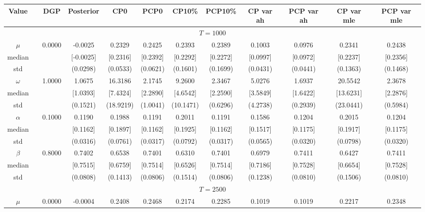 { \renewcommand{\arraystretch}{1.2} 
\begin{sidewaystable} 
\center 
\begin{tabular}{cc cc| cccc| cccc} 
Value && DGP & Posterior & CP0  & PCP0 & CP10\%  & PCP10\% &CP var ah & PCP var ah & CP var mle & PCP var mle \\ \hline 
\hline 
\multicolumn{12}{c}{$T =1000$}  \\ 
\hline 
 \rowcolor{LightCyan} 
$\mu$&& 0.0000 & -0.0025 & 0.2329 & 0.2425 & 0.2393 & 0.2389 & 0.1003 & 0.0976 & 0.2341 & 0.2438  \\   
median &&  & [-0.0025] & [0.2316] & [0.2392] & [0.2292] & [0.2272] & [0.0997] & [0.0972] & [0.2237] & [0.2356]  \\ 
std &&   & (0.0298) & (0.0533) & (0.0621) & (0.1601) & (0.1699) &(0.0431) & (0.0441) & (0.1363) & (0.1468)  \\ 
 \rowcolor{LightCyan} 
$\omega$&& 1.0000 & 1.0675 & 16.3186 & 2.1745 & 9.2600 & 2.3467 & 5.0276 & 1.6937 & 20.5542 & 2.3678  \\   
median &&  & [1.0393] & [7.4324] & [2.2890] & [4.6542] & [2.2590] & [3.5849] & [1.6422] & [13.6231] & [2.2876]  \\ 
std &&   & (0.1521) & (18.9219) & (1.0041) & (10.1471) & (0.6296) &(4.2738) & (0.2939) & (23.0441) & (0.5984)  \\ 
 \rowcolor{LightCyan} 
$\alpha$&& 0.1000 & 0.1190 & 0.1988 & 0.1191 & 0.2011 & 0.1191 & 0.1586 & 0.1204 & 0.2015 & 0.1204  \\   
median &&  & [0.1162] & [0.1897] & [0.1162] & [0.1925] & [0.1162] & [0.1517] & [0.1175] & [0.1917] & [0.1175]  \\ 
std &&   & (0.0316) & (0.0761) & (0.0317) & (0.0792) & (0.0317) &(0.0565) & (0.0320) & (0.0798) & (0.0320)  \\ 
 \rowcolor{LightCyan} 
$\beta$&& 0.8000 & 0.7402 & 0.6538 & 0.7401 & 0.6310 & 0.7401 & 0.6979 & 0.7411 & 0.6427 & 0.7411  \\   
median &&  & [0.7515] & [0.6759] & [0.7514] & [0.6526] & [0.7514] & [0.7186] & [0.7528] & [0.6654] & [0.7528]  \\ 
std &&   & (0.0808) & (0.1413) & (0.0806) & (0.1514) & (0.0806) &(0.1238) & (0.0810) & (0.1506) & (0.0810)  \\ 
\hline 
\multicolumn{12}{c}{$T =2500$}  \\ 
\hline 
 \rowcolor{LightCyan} 
$\mu$&& 0.0000 & -0.0004 & 0.2408 & 0.2468 & 0.2174 & 0.2285 & 0.1019 & 0.1019 & 0.2217 & 0.2348  \\   

\end{tabular}
\end{sidewaystable}}
